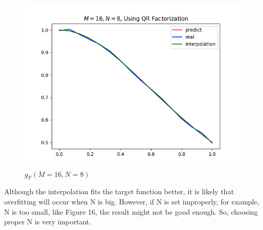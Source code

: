 \documentclass[10pt]{article}
\begin{document}
\begin{enumerate}[label=4.\arabic*]
\begin{figure}[H]
\begin{minipage}[c]{0.45\textwidth}
    		\includegraphics[width=1\textwidth]{./QR/M=16N=8F.png}
    		\caption{$g_F(M=16,N=8)$}
    	\end{minipage}
    \end{figure}
	Although the interpolation fits the target function better, it is likely that overfitting will occur when N is big. However, if N is set improperly, for example, N is too small, like Figure 16, the result might not be good enough. So, choosing proper N is very important.
\end{enumerate}
\end{document}
